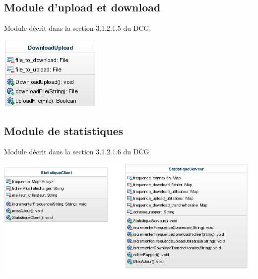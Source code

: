 \documentclass[10pt,a4paper]{report}
\begin{document}
\subsection{Module d'upload et download}
Module décrit dans la section 3.1.2.1.5 du DCG.
\begin{center}
	\includegraphics{./Ressources/downlaodUpload.jpeg}\\
\end{center}

\subsection{Module de statistiques}
Module décrit dans la section 3.1.2.1.6 du DCG.
\begin{center}
	\includegraphics{./Ressources/statistique.jpeg}\\
\end{center}

\newpage
\end{document}
